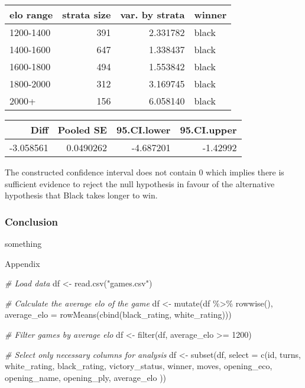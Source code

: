 \documentclass[11pt,]{article}
\newenvironment{Shaded}{\begin{snugshade}}{\end{snugshade}}
\newcommand{\AttributeTok}[1]{\textcolor[rgb]{0.77,0.63,0.00}{#1}}
\newcommand{\CommentTok}[1]{\textcolor[rgb]{0.56,0.35,0.01}{\textit{#1}}}
\newcommand{\DecValTok}[1]{\textcolor[rgb]{0.00,0.00,0.81}{#1}}
\newcommand{\FunctionTok}[1]{\textcolor[rgb]{0.00,0.00,0.00}{#1}}
\newcommand{\NormalTok}[1]{#1}
\newcommand{\OtherTok}[1]{\textcolor[rgb]{0.56,0.35,0.01}{#1}}
\newcommand{\SpecialCharTok}[1]{\textcolor[rgb]{0.00,0.00,0.00}{#1}}
\newcommand{\StringTok}[1]{\textcolor[rgb]{0.31,0.60,0.02}{#1}}
\begin{document}
\begin{tabular}{l|r|r|l}
\hline
elo range & strata size & var. by strata & winner\\
\hline
1200-1400 & 391 & 2.331782 & black\\
\hline
1400-1600 & 647 & 1.338437 & black\\
\hline
1600-1800 & 494 & 1.553842 & black\\
\hline
1800-2000 & 312 & 3.169745 & black\\
\hline
2000+ & 156 & 6.058140 & black\\
\hline
\end{tabular}

\begin{tabular}{r|r|r|r}
\hline
Diff & Pooled SE & 95.CI.lower & 95.CI.upper\\
\hline
-3.058561 & 0.0490262 & -4.687201 & -1.42992\\
\hline
\end{tabular}

The constructed confidence interval does not contain 0 which implies
there is sufficient evidence to reject the null hypothesis in favour of
the alternative hypothesis that Black takes longer to win.\\
\newline

\hypertarget{conclusion}{%
\subsubsection{Conclusion}\label{conclusion}}

something

\newpage
\begin{center}
\Large{Appendix}
\end{center}

\begin{Shaded}
\begin{Highlighting}[]
\CommentTok{\# Load data}
\NormalTok{df }\OtherTok{\textless{}{-}} \FunctionTok{read.csv}\NormalTok{(}\StringTok{"games.csv"}\NormalTok{)}

\CommentTok{\# Calculate the average elo of the game}
\NormalTok{df }\OtherTok{\textless{}{-}} \FunctionTok{mutate}\NormalTok{(df }\SpecialCharTok{\%\textgreater{}\%} \FunctionTok{rowwise}\NormalTok{(),}
       \AttributeTok{average\_elo =} \FunctionTok{rowMeans}\NormalTok{(}\FunctionTok{cbind}\NormalTok{(black\_rating, white\_rating)))}

\CommentTok{\# Filter games by average elo}
\NormalTok{df }\OtherTok{\textless{}{-}} \FunctionTok{filter}\NormalTok{(df, average\_elo }\SpecialCharTok{\textgreater{}=} \DecValTok{1200}\NormalTok{)}

\CommentTok{\# Select only necessary columns for analysis}
\NormalTok{df }\OtherTok{\textless{}{-}} \FunctionTok{subset}\NormalTok{(df, }
             \AttributeTok{select =} \FunctionTok{c}\NormalTok{(id, turns, white\_rating, black\_rating, victory\_status, }
\NormalTok{                        winner, moves, opening\_eco, opening\_name, opening\_ply, average\_elo ))}
\end{Highlighting}
\end{Shaded}
\end{document}
